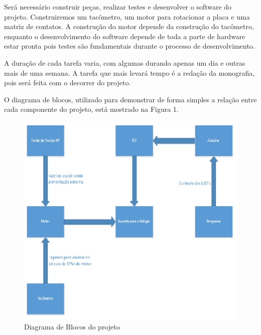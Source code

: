 Será necessário construir peças, realizar testes e desenvolver o software do projeto. Construiremos um tacômetro, um motor para rotacionar a placa e uma matriz de contatos.
A construção do motor depende da construção do tacômetro, enquanto o desenvolvimento do software depende de toda a parte de hardware estar pronta pois testes são fundamentais durante o processo de desenvolvimento.

A duração de cada tarefa varia, com algumas durando apenas um dia e outras mais de uma semana. A tarefa que mais levará tempo é a redação da monografia, pois será feita com o decorrer do projeto.

O diagrama de blocos, utilizado para demonstrar de forma simples a relação entre cada componente do projeto, está mostrado na Figura 1.

\begin{figure}[!h]
	\centering
	\includegraphics{./Diagrama_Blocos.png}
	\caption[Diagrama de Blocos do projeto]{Diagrama de Blocos do projeto}
	\label{fig:Diagrama_Blocos}
\end{figure}

